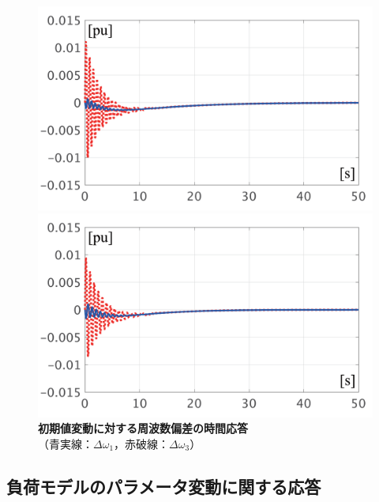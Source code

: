 \documentclass[tombow,dvipdfmx]{corona-a5-1.1}
\begin{document}
\begin{figure}[t]
  \centering
  {
  \begin{minipage}{0.49\linewidth}
    \centering
    \includegraphics[width = 1.0\linewidth]{figs/P1ini}
  \end{minipage}
  \begin{minipage}{0.49\linewidth}
    \centering
    \includegraphics[width = 1.0\linewidth]{figs/P3ini}
  \end{minipage}
  \medskip
  \caption{\textbf{初期値変動に対する周波数偏差の時間応答}
  \\ \centering（青実線：$\Delta \omega_1$，赤破線：$\Delta \omega_3$）}
  \label{fig:P13ini}
  }
\medskip
\end{figure}

\subsection{負荷モデルのパラメータ変動に関する応答}\label{sec:resldpara}
\end{document}

